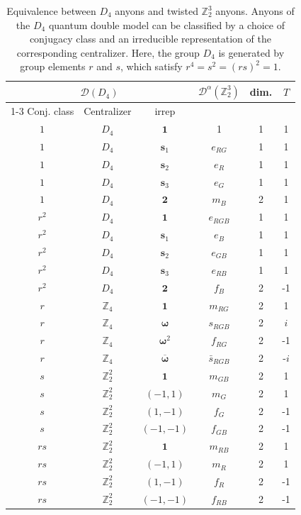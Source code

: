 \documentclass[nofootinbib,pra,twocolumn,showpacs,superscriptaddress,notitlepage,amsmath]{revtex4-2} %
\def\ZZ{\mathbb Z}
\def\bs#1{\boldsymbol{#1}}
\begin{document}
\begin{table}[h!]
    \centering
        \begin{tabular}{|c|c|c||c||c|c|}
        \hline
 \multicolumn{3}{|c||}{$\mathcal D(D_4)$} & \multirow{2}{*}{$\mathcal D^\alpha(\ZZ_2^3)$} & \multirow{2}{*}{dim.} & \multirow{2}{*}{$T$}\\
 \cline{1-3}
Conj. class & Centralizer & irrep &&  &\\
    \hline
          $1$ &$D_4$ & $\bs 1$  & 1      & 1 & 1\\
      $1$ &$D_4$ &  $\bs s_1$  & $e_{RG}$      & 1  & 1\\
        $1$ &$D_4$ &  $\bs s_2$ & $e_{R}$      & 1 & 1\\
  $1$ &$D_4$ & $\bs s_3$  & $e_{G}$       & 1 & 1\\
        $1$ &$D_4$ & $\bs 2$  & $m_B$       & 2 & 1 \\
\hline
          ${r^2}$ &$D_4$ &$\bs 1$  & $e_{RGB}$   & 1 & 1\\
${r^2}$ &$D_4$ &$\bs s_1$  & $e_{B}$   & 1 & 1\\
     ${r^2}$ &$D_4$ &  $\bs s_2$ &$e_{GB}$    & 1 & 1\\
  ${r^2}$ &$D_4$ &$\bs s_3$ &$e_{RB}$  & 1 & 1\\
      ${r^2}$ &$D_4$ &$\bs 2$  &$f_B$ & 2 & -1\\
\hline
        ${r}$ &$\ZZ_4$ & $\bs 1$ & $m_{RG}$  & 2 & 1\\
             ${r}$ &$\ZZ_4$ & $\bs \omega$ & $ s_{RGB}$  & 2 &$i$\\
   ${r}$ &$\ZZ_4$ & $\bs \omega^2$ & $f_{RG}$  &2 & -1\\
   ${r}$ &$\ZZ_4$ & $\overline{\bs \omega}$ & $\bar s_{RGB}$ & 2 &-$i$\\
\hline
               ${s}$ &$\ZZ_2^2$ & $\bs 1$ &$m_{GB}$ & 2 & 1\\
              ${s}$ &$\ZZ_2^2$ &$(-1,1)$&$m_{G}$ & 2 &1\\
     ${s}$ &$\ZZ_2^2$ & $(1,-1)$ &$f_{G}$& 2 &-1\\
       ${s}$ &$\ZZ_2^2$ & $(-1,-1)$ &$f_{GB}$& 2 &-1 \\
\hline
         ${rs}$ &$\ZZ_2^2$ &$\bs 1$ &$m_{RB}$ & 2 & 1\\
     ${rs}$ &$\ZZ_2^2$ & $(-1,1)$ &$m_{R}$& 2 &1 \\
    ${rs}$ &$\ZZ_2^2$ &$(1,-1)$&$f_{R}$& 2 &-1 \\
 ${rs}$ &$\ZZ_2^2$ & $(-1,-1)$& $f_{RB}$& 2 & -1\\
    \hline
    \end{tabular}
    \caption{Equivalence between $D_4$ anyons and twisted $\ZZ_2^3$ anyons. Anyons of the $D_4$ quantum double model can be classified by a choice of conjugacy class and an irreducible representation of the corresponding centralizer. Here, the group $D_4$ is generated by group elements $r$ and $s$, which satisfy $r^4 = s^2 = (rs)^2 =1$.}
        \label{tab:D4anyons}
    \end{table}

\clearpage

 
 
\end{document}
